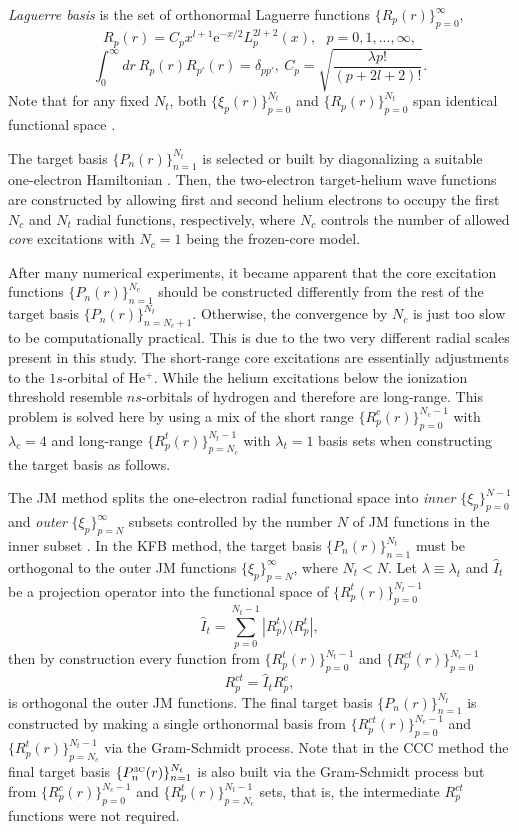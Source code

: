 \documentclass[aip
, pra
, showpacs
, aps
, twocolumn
, groupedaddress
, floatfix
]{revtex4}
\newcommand{\beq}{\begin{equation}}
\newcommand{\eeq}{\end{equation}}
\begin{document}
{\em Laguerre basis} is the set of orthonormal Laguerre functions $\{R_p(r)\}_{p=0}^\infty$,
\beq
R_p(r) = C_p x^{l+1} \mbox{e}^{-x /2}
L_p^{2l+2}(x), \ \ \ p = 0, 1, ..., \infty,
\eeq
\beq
\int_0^\infty dr \ R_p(r) R_{p'}(r) = \delta_{pp'}, \ C_p= \sqrt{\frac{\lambda p!}{ (p+2l+2)!}}.
\eeq
Note that for any fixed $N_t$, both $\{\xi_p(r)\}_{p=0}^{N_t}$ and $\{R_p(r)\}_{p=0}^{N_t}$
span identical functional space \cite{KB10p022708}.


The target basis $\{P_n(r)\}_{n=1}^{N_t}$ is selected or built by diagonalizing a suitable one-electron Hamiltonian \cite{KB10p022708, KFB11}. Then,
the two-electron target-helium wave functions are constructed by allowing first and second helium electrons to occupy the first $N_c$ and $N_t$ radial functions, respectively,
where $N_c$ controls the number of allowed {\em core} excitations with $N_c=1$ being the frozen-core model.


After many numerical experiments, it became apparent that the core excitation functions $\{P_n(r)\}_{n=1}^{N_c}$ should be constructed differently from the rest of the target basis
$\{P_n(r)\}_{n=N_c+1}^{N_t}$. Otherwise, the convergence by $N_c$ is just too slow to be computationally practical.
This is due to the two very different radial scales present in this study.
The short-range core excitations are essentially adjustments to the $1s$-orbital of He$^+$.
While the helium excitations below the ionization threshold resemble $ns$-orbitals of hydrogen and therefore are long-range.
This problem is solved here by using a mix of the short range $\{R^c_p(r)\}_{p=0}^{N_c-1}$ with $\lambda_c=4$
and long-range $\{R^t_p(r)\}_{p=N_c}^{N_t-1}$ with $\lambda_t=1$  basis sets
when constructing the target basis as follows.


The JM method splits the one-electron radial functional space into {\em inner} $\{\xi_p\}_{p=0}^{N-1}$
and {\em outer} $\{\xi_p\}_{p=N}^\infty$
subsets controlled by the number $N$ of JM functions in the inner subset \cite{HY74p1201,BR76p1491}.
In the KFB method, the target basis $\{P_n(r)\}_{n=1}^{N_t}$ must be orthogonal to the outer JM functions $\{\xi_p\}_{p=N}^\infty$, where $N_t<N$.
Let $\lambda \equiv \lambda_t$ and $\hat{I}_t$ be a projection operator into the functional space of $\{R^t_p(r)\}_{p=0}^{N_t-1}$
\beq
\hat{I}_t = \sum_{p=0}^{N_t-1} | R_p^t \rangle \langle R_p^t |,
\eeq
then by construction every function from $\{R^t_p(r)\}_{p=0}^{N_t-1}$ and  $\{R^{ct}_p(r)\}_{p=0}^{N_c-1}$
\beq
R^{ct}_p = \hat{I}_t R^{c}_p,
\eeq
is orthogonal the outer JM functions.
The final target basis $\{P_n(r)\}_{n=1}^{N_t}$ is constructed by making a single orthonormal basis from
$\{R^{ct}_p(r)\}_{p=0}^{N_c-1}$ and $\{R^t_p(r)\}_{p=N_c}^{N_t-1}$
via the Gram-Schmidt process.
Note that in the CCC method the final target basis
$\{P^{\mbox{{\tiny 3C}}}_n(r)\}_{n=1}^{N_t}$ is also built via the Gram-Schmidt process but from
$\{R^{c}_p(r)\}_{p=0}^{N_c-1}$ and $\{R^t_p(r)\}_{p=N_c}^{N_t-1}$ sets, that is, the intermediate $R^{ct}_p$ functions were not required.
\end{document}
